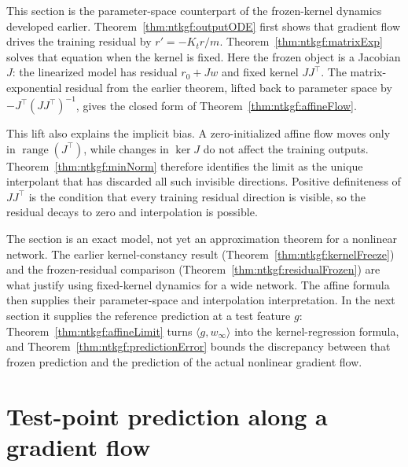\begin{remark}
This section is the parameter-space counterpart of the frozen-kernel dynamics developed earlier.
Theorem~\ref{thm:ntkgf:outputODE} first shows that gradient flow drives the training residual by
$r'=-K_t r/m$. Theorem~\ref{thm:ntkgf:matrixExp} solves that equation when the kernel is fixed.
Here the frozen object is a Jacobian $J$: the linearized model has residual $r_0+Jw$ and fixed
kernel $JJ^\top$. The matrix-exponential residual from the earlier theorem, lifted back to parameter
space by $-J^\top(JJ^\top)^{-1}$, gives the closed form of
Theorem~\ref{thm:ntkgf:affineFlow}.

This lift also explains the implicit bias. A zero-initialized affine flow moves only in
$\operatorname{range}(J^\top)$, while changes in $\ker J$ do not affect the training outputs.
Theorem~\ref{thm:ntkgf:minNorm} therefore identifies the limit as the unique interpolant that has
discarded all such invisible directions. Positive definiteness of $JJ^\top$ is the condition that
every training residual direction is visible, so the residual decays to zero and interpolation is
possible.

The section is an exact model, not yet an approximation theorem for a nonlinear network.
The earlier kernel-constancy result (Theorem~\ref{thm:ntkgf:kernelFreeze}) and the frozen-residual
comparison (Theorem~\ref{thm:ntkgf:residualFrozen}) are what justify using fixed-kernel dynamics
for a wide network. The affine formula then supplies their parameter-space and interpolation
interpretation. In the next section it supplies the reference prediction at a test feature $g$:
Theorem~\ref{thm:ntkgf:affineLimit} turns $\langle g,w_\infty\rangle$ into the kernel-regression
formula, and Theorem~\ref{thm:ntkgf:predictionError} bounds the discrepancy between that frozen
prediction and the prediction of the actual nonlinear gradient flow.
\end{remark}


\section{Test-point prediction along a gradient flow}\label{sec:ntkgf:testPrediction}


